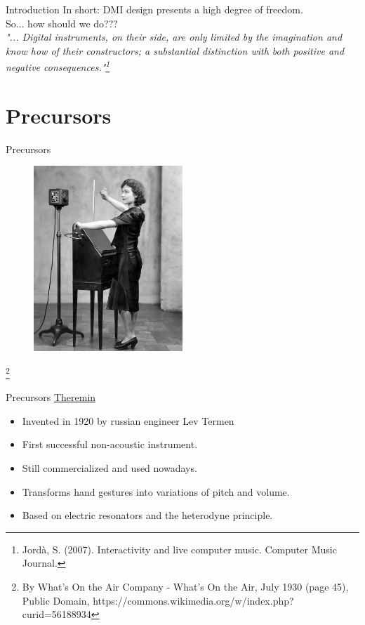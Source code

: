 \documentclass{beamer}
\newcommand\blfootnote[1]{%
  \begingroup
  \renewcommand\thefootnote{}\footnote{#1}%
  \addtocounter{footnote}{-1}%
  \endgroup
}
\begin{document}
\begin{frame}{Introduction}
    In short: DMI design presents a high degree of freedom.\\
    \vspace{5mm}
    So... how should we do???\\
    \vspace{5mm}
    \textit{"... Digital instruments, on their side, are only limited by the imagination and know how of their constructors; a substantial distinction with both positive and negative consequences."\footnote{Jordà, S. (2007). Interactivity and live computer music. Computer Music Journal.}}
\end{frame}



\section{Precursors}

\begin{frame}{Precursors}
    \begin{figure}[h]
        \includegraphics[width=0.5\textwidth]{theremin.jpg}
    \end{figure}
\blfootnote{By What's On the Air Company - What's On the Air, July 1930 (page 45), Public Domain, https://commons.wikimedia.org/w/index.php?curid=56188934}
\end{frame}

\begin{frame}{Precursors}
    \href{https://www.youtube.com/watch?v=uuKBPEDU-W0}{Theremin}
    \vspace{5mm}
    \begin{itemize}
        \item Invented in 1920 by russian engineer Lev Termen 
        \item First successful non-acoustic instrument.
        \item Still commercialized and used nowadays.
        \item Transforms hand gestures into variations of pitch and volume.
        \item Based on electric resonators and the heterodyne principle.
    \end{itemize}
\end{frame}
\end{document}

